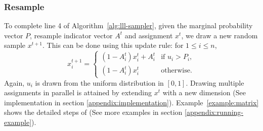 \subsubsection*{Resample} To complete line 4 of Algorithm~\ref{alg:lll-sampler}, given the marginal
probability vector $P$, resample indicator vector $A^t$ and assignment $x^t$,
we draw a new random sample $x^{t+1}$. This can be done using this update rule:
for $1\le i\le n$,
\begin{equation} \label{eq:iterative}
    x_i^{t+1}=\begin{cases}
        (1-A^t_i) x_i^t+A^t_i & \text{if } u_i>P_i, \\
        (1-A^t_i) x_i^t       & \text{otherwise}.
    \end{cases}
\end{equation}
Again, $u_i$ is drawn from the uniform distribution in $[0, 1]$.
%
Drawing multiple assignments in parallel is attained by extending $x^t$ with a
new dimension (See implementation in section \ref{appendix:implementation}).
%
Example~\ref{example:matrix} shows the detailed steps of \nls (See more examples
in section \ref{appendix:running-example}).

